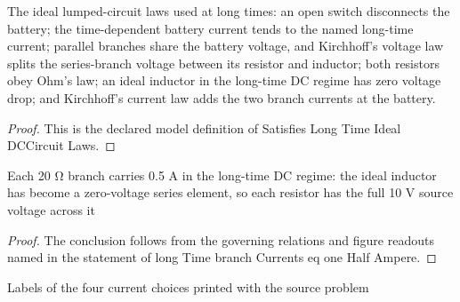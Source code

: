 \begin{definition}
  \label{def:physics:phyx-mini-0881:phyxminiproblems-problemphyxmini0881-satisfieslongtimeidealdccircuitlaws}
  The ideal lumped-circuit laws used at long times: an open switch disconnects the battery; the time-dependent battery current tends to the named long-time current; parallel branches share the battery voltage, and Kirchhoff's voltage law splits the series-branch voltage between its resistor and inductor; both resistors obey Ohm's law; an ideal inductor in the long-time DC regime has zero voltage drop; and Kirchhoff's current law adds the two branch currents at the battery.
\end{definition}
\begin{proof}
  This is the declared model definition of Satisfies Long Time Ideal DCCircuit Laws.
\end{proof}
\begin{lemma}
  \label{lem:physics:phyx-mini-0881:phyxminiproblems-problemphyxmini0881-longtime-branchcurrents-eq-onehalfampere}
  Each 20 Ω branch carries 0.5 A in the long-time DC regime: the ideal inductor has become a zero-voltage series element, so each resistor has the full 10 V source voltage across it
\end{lemma}
\begin{proof}
  The conclusion follows from the governing relations and figure readouts named in the statement of long Time branch Currents eq one Half Ampere.
\end{proof}
\begin{definition}
  \label{def:physics:phyx-mini-0881:phyxminiproblems-problemphyxmini0881-answerchoice}
  Labels of the four current choices printed with the source problem
\end{definition}
